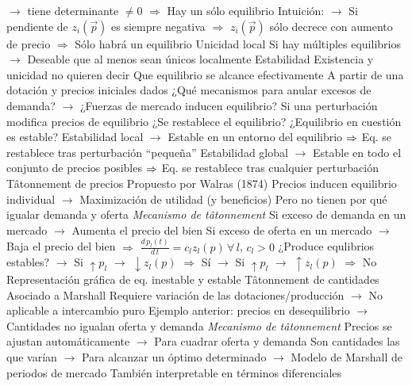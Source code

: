 \documentclass{nuevotema}
\begin{document}
\begin{esquemal}
				\4[] $\to$ tiene determinante $\neq 0$
				\4[] $\Rightarrow$ Hay un sólo equilibrio
				\4[] Intuición:
				\4[] $\to$ Si pendiente de $z_i(\vec{p})$ es siempre negativa
				\4[] $\Rightarrow$ $z_i(\vec{p})$ sólo decrece con aumento de precio
				\4[] $\Rightarrow$ Sólo habrá un equilibrio
				\4 Unicidad local
				\4[] Si hay múltiples equilibrios
				\4[] $\to$ Deseable que al menos sean únicos localmente
				\4[] 
			\3 Estabilidad
				\4 Existencia y unicidad no quieren decir
				\4[] Que equilibrio se alcance efectivamente
				\4 A partir de una dotación y precios iniciales dados
				\4[] ¿Qué mecanismos para anular excesos de demanda?
				\4[] $\to$ ¿Fuerzas de mercado inducen equilibrio?
				\4 Si una perturbación modifica precios de equilibrio
				\4[] ¿Se restablece el equilibrio?
				\4[$\Rightarrow$] ¿Equilibrio en cuestión es estable?
				\4 Estabilidad local
				\4[] $\to$ Estable en un entorno del equilibrio
				\4[] $\Rightarrow$ Eq. se restablece tras perturbación ``pequeña''
				\4 Estabilidad global
				\4[] $\to$ Estable en todo el conjunto de precios posibles
				\4[] $\Rightarrow$ Eq. se restablece tras cualquier perturbación
				\4 Tâtonnement de precios
				\4[] Propuesto por Walras (1874)
				\4[] Precios inducen equilibrio individual
				\4[] $\to$ Maximización de utilidad (y beneficios)
				\4[] Pero no tienen por qué igualar demanda y oferta
				\4[] \textit{Mecanismo de tâtonnement}
				\4[] Si exceso de demanda en un mercado
				\4[] $\to$ Aumenta el precio del bien
				\4[] Si exceso de oferta en un mercado
				\4[] $\to$ Baja el precio del bien
				\4[] $\Rightarrow$ $\frac{d \, p_l(t)}{d \, t} = c_l z_l (p) \, \forall \, l$, $c_l >0$
				\4[] ¿Produce equlibrios estables?
				\4[] $\to$ Si $\uparrow p_l$ $\to$ $\downarrow z_l(p)$ $\Rightarrow$ Sí
				\4[] $\to$ Si $\uparrow p_l$ $\to$ $\uparrow z_l(p)$ $\Rightarrow$ No
				\4[] Representación gráfica de eq. inestable y estable
				\4[] 
				\4 Tâtonnement de cantidades
				\4[] Asociado a Marshall
				\4[] Requiere variación de las dotaciones/producción
				\4[] $\to$ No aplicable a intercambio puro
				\4[] Ejemplo anterior: precios en desequilibrio
				\4[] $\to$ Cantidades no igualan oferta y demanda
				\4[] \textit{Mecanismo de tâtonnement}
				\4[] Precios se ajustan automáticamente
				\4[] $\to$ Para cuadrar oferta y demanda
				\4[] Son cantidades las que varían
				\4[] $\to$ Para alcanzar un óptimo determinado
				\4[] $\to$ Modelo de Marshall de periodos de mercado
				\4[] 
				\4[] También interpretable en términos diferenciales

\end{esquemal}
\end{document}
